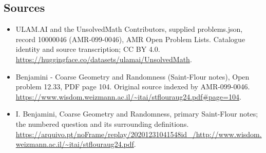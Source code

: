 \documentclass[11pt,a4paper]{article}
\begin{document}
\subsection{Sources}
\begin{itemize}
\item[S1] ULAM.AI and the UnsolvedMath Contributors, supplied problems.json, record 10000046 (AMR-099-0046), AMR Open Problem Lists. Catalogue identity and source transcription; CC BY 4.0.
\url{https://huggingface.co/datasets/ulamai/UnsolvedMath}.
\item[S2] Benjamini - Coarse Geometry and Randomness (Saint-Flour notes), Open problem 12.33, PDF page 104. Original source indexed by AMR-099-0046.
\url{https://www.wisdom.weizmann.ac.il/~itai/stflouraug24.pdf#page=104}.
\item[S3] I. Benjamini, Coarse Geometry and Randomness, primary Saint-Flour notes; the numbered question and its surrounding definitions.
\url{https://arquivo.pt/noFrame/replay/20201231041548id_/http://www.wisdom.weizmann.ac.il/~itai/stflouraug24.pdf}.
\end{itemize}
\end{document}

